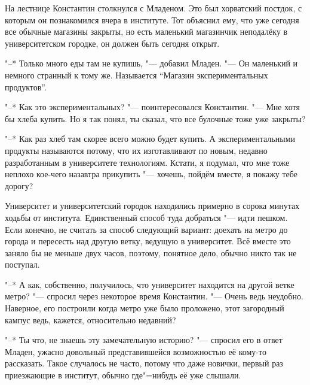 На лестнице Константин столкнулся с Младеном.
Это был хорватский постдок, с которым он познакомился вчера в институте.
Тот объяснил ему, что уже сегодня все обычные магазины закрыты, но есть
маленький магазинчик неподалёку в университетском городке, он должен быть
сегодня открыт.

"--* Только много еды там не купишь, "--- добавил Младен.
"--- Он маленький и немного странный к тому же.
Называется \enquote{Магазин экспериментальных продуктов}.

"--* Как это экспериментальных? "--- поинтересовался Константин.
"--- Мне хотя бы хлеба купить.
Но я так понял, ты сказал, что все булочные тоже уже закрыты?

"--* Как раз хлеб там скорее всего можно будет купить.
А экспериментальными продукты называются потому, что их изготавливают по новым,
недавно разработанным в университете технологиям.
Кстати, я подумал, что мне тоже неплохо кое-чего назавтра прикупить "--- хочешь,
пойдём вместе, я покажу тебе дорогу?

Университет и университетский городок находились примерно в сорока минутах
ходьбы от института.
Единственный способ туда добраться "--- идти пешком.
Если конечно, не считать за способ следующий вариант: доехать на метро до города
и пересесть над другую ветку, ведущую в университет.
Всё вместе это заняло бы не меньше двух часов, поэтому, понятное дело, обычно
никто так не поступал.

"--* А как, собственно, получилось, что университет находится на другой ветке
метро? "--- спросил через некоторое время Константин.
"--- Очень ведь неудобно.
Наверное, его построили когда метро уже было проложено, этот загородный кампус
ведь, кажется, относительно недавний?

"--* Ты что, не знаешь эту замечательную историю? "--- спросил его в ответ
Младен, ужасно довольный представившейся возможностью её кому-то рассказать.
Такое случалось не часто, потому что даже новички, первый раз приезжающие в
институт, обычно где"=нибудь её уже слышали.

